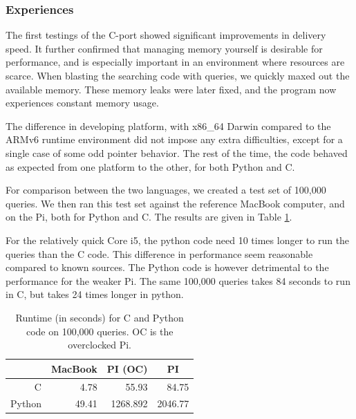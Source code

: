 \subsubsection{Experiences}
The first testings of the C-port showed significant improvements in delivery speed.
It further confirmed that managing memory yourself is desirable for performance, and is especially important in an environment where resources are scarce.
When blasting the searching code with queries, we quickly maxed out the available memory.
These memory leaks were later fixed, and the program now experiences constant memory usage.

The difference in developing platform, with x86\_64 Darwin compared to the ARMv6 runtime environment did not impose any extra difficulties, except for a single case of some odd pointer behavior.
The rest of the time, the code behaved as expected from one platform to the other, for both Python and C.

For comparison between the two languages, we created a test set of 100,000 queries. We then ran this test set against the reference MacBook computer, and on the Pi, both for Python and {C}.
The results are given in Table \ref{tbl:runtimes_ports}.

For the relatively quick {Core i5}, the python code need 10 times longer to run the queries than the C code. This difference in performance seem reasonable compared to known sources.
The Python code is however detrimental to the performance for the weaker Pi. The same 100,000 queries takes 84 seconds to run in C, but takes 24 times longer in python.

\begin{table}[h]
	\begin{center}
	\begin{tabular}{|r|r|r|r|}
	\hline
	   & \multicolumn{1}{|c|}{MacBook} & \multicolumn{1}{|c|}{PI (OC)}  & \multicolumn{1}{|c|}{PI} \\
	\hline
	C      & 4.78 & 55.93 & 84.75     \\
	\hline
	Python & 49.41 & 1268.892 & 2046.77   \\

	\hline
	\end{tabular}
	\caption{Runtime (in seconds) for C and Python code on 100,000 queries. OC is the overclocked Pi.}
	\label{tbl:runtimes_ports}
	\end{center}
\end{table}
